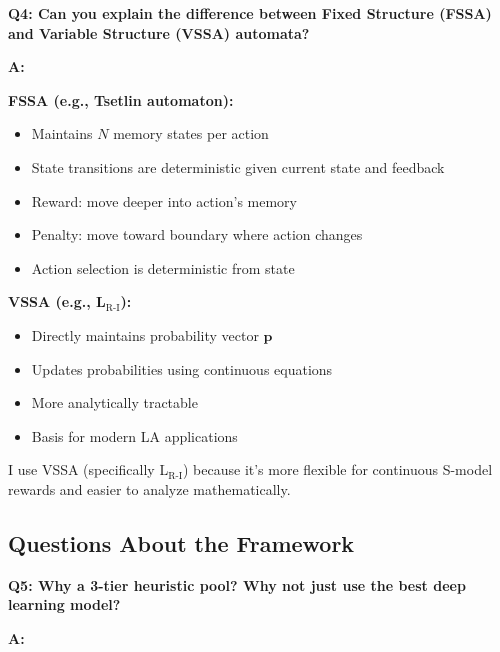 \documentclass[11pt]{article}
\begin{document}
\textbf{Q4: Can you explain the difference between Fixed Structure (FSSA) and Variable Structure (VSSA) automata?}

\textbf{A:}

\textbf{FSSA (e.g., Tsetlin automaton):}
\begin{itemize}
    \item Maintains $N$ memory states per action
    \item State transitions are deterministic given current state and feedback
    \item Reward: move deeper into action's memory
    \item Penalty: move toward boundary where action changes
    \item Action selection is deterministic from state
\end{itemize}

\textbf{VSSA (e.g., L$_{\text{R-I}}$):}
\begin{itemize}
    \item Directly maintains probability vector $\mathbf{p}$
    \item Updates probabilities using continuous equations
    \item More analytically tractable
    \item Basis for modern LA applications
\end{itemize}

I use VSSA (specifically L$_{\text{R-I}}$) because it's more flexible for continuous S-model rewards and easier to analyze mathematically.

\subsection{Questions About the Framework}

\textbf{Q5: Why a 3-tier heuristic pool? Why not just use the best deep learning model?}

\textbf{A:}
\end{document}

